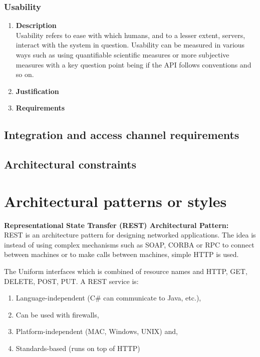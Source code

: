 \documentclass[a4paper,10pt]{article}
\begin{document}
	\subsubsection{Usability}
		\begin{enumerate}
			\item \textbf{Description} \\
				Usability refers to ease with which humans, and to a lesser extent, servers, interact with the system in question. Usability can be measured in various ways such as using quantifiable scientific measures or more subjective measures with a key question point being if the API follows conventions and so on.

			\item \textbf{Justification} \\
			\item \textbf{Requirements}\\
		\end{enumerate}

\subsection{Integration and access channel requirements}
\subsection{Architectural constraints}

\section{Architectural patterns or styles}

\item \textbf{Representational State Transfer (REST) Architectural Pattern:}\\
		REST is an architecture pattern for designing networked applications. The idea is instead of using complex mechanisms such as SOAP, CORBA or RPC to connect between machines or to make calls between machines, simple HTTP is used.
		
		The Uniform interfaces which is combined of resource names and HTTP, GET, DELETE, POST, PUT.
		A REST service is:
		\begin{enumerate}
			\item Language-independent (C\# can communicate to Java, etc.),
			\item Can be used with firewalls,
			\item Platform-independent (MAC, Windows, UNIX) and,
			\item Standards-based (runs on top of HTTP)
		\end{enumerate}
\end{document}
